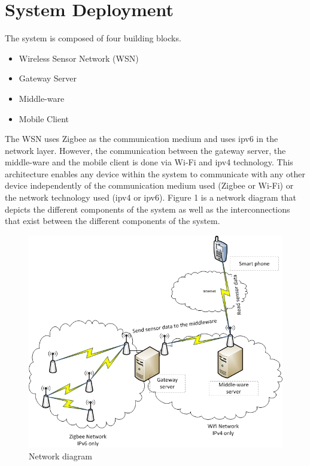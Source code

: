 \documentclass[conference]{IEEEtran}
\begin{document}
\section{System Deployment}
The system is composed of four building blocks. 
\begin{itemize}
\item Wireless Sensor Network (WSN)
\item Gateway Server
\item Middle-ware
\item Mobile Client
\end{itemize}
The WSN uses Zigbee as the communication medium and uses \gls{ipv6} in the network layer. However, the communication between the gateway server, the middle-ware and the mobile client is done via Wi-Fi and \gls{ipv4} technology. This architecture enables any device within the system to communicate with any other device independently of the communication medium used (Zigbee or Wi-Fi) or the network technology used (\gls{ipv4} or \gls{ipv6}). Figure 1 is a network diagram that depicts the different components of the system as well as the interconnections that exist between the different components of the system.

\begin{figure}[htbp]
\centering
\includegraphics[scale=0.48]{images/network_diagram.jpg}
\caption{Network diagram}
\label{fig:network}
\end{figure}
\end{document}
